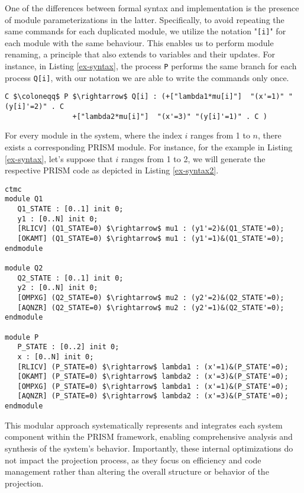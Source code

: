 One of the differences between formal syntax and implementation is the presence of module parameterizations in the latter. Specifically, to avoid repeating the same commands for each duplicated module, we utilize the notation "\texttt{[i]}" for each module with the same behaviour.   
This enables us to perform module renaming, a principle that also extends to variables and their updates. For instance, in Listing \ref{ex-syntax}, the process \texttt{P} performs the same branch for each process \texttt{Q[i]}, with our notation we are able to write the commands only once. 
\begin{lstlisting}[style=chor-color,breaklines=true, postbreak=\mbox{\textcolor{red}{$\hookrightarrow$}\space},caption={Example of an use of parameterization in the choreographic language},captionpos=b,label={ex-syntax}]
	C $\coloneqq$ P $\rightarrow$ Q[i] : (+["lambda1*mu[i]"]  "(x'=1)" "(y[i]'=2)" . C
			    +["lambda2*mu[i]"]  "(x'=3)" "(y[i]'=1)" . C )
\end{lstlisting}
For every module in the system, where the index 
$i$ ranges from 1 to $n$, there exists a corresponding PRISM module. For instance, for the example in Listing \ref{ex-syntax}, let's suppose that $i$ ranges  from 1 to 2, we will generate the respective PRISM code as depicted in Listing \ref{ex-syntax2}. 
\begin{lstlisting}[style=prism-color,caption={PRISM code generated for the choreography in Listing \ref{ex-syntax}},captionpos=b,label={ex-syntax2}]
ctmc
module Q1
   Q1_STATE : [0..1] init 0;
   y1 : [0..N] init 0;
   [RLICV] (Q1_STATE=0) $\rightarrow$ mu1 : (y1'=2)&(Q1_STATE'=0);
   [OKAMT] (Q1_STATE=0) $\rightarrow$ mu1 : (y1'=1)&(Q1_STATE'=0);
endmodule

module Q2
   Q2_STATE : [0..1] init 0;
   y2 : [0..N] init 0;
   [OMPXG] (Q2_STATE=0) $\rightarrow$ mu2 : (y2'=2)&(Q2_STATE'=0);
   [AQNZR] (Q2_STATE=0) $\rightarrow$ mu2 : (y2'=1)&(Q2_STATE'=0);
endmodule

module P
   P_STATE : [0..2] init 0;
   x : [0..N] init 0;
   [RLICV] (P_STATE=0) $\rightarrow$ lambda1 : (x'=1)&(P_STATE'=0);
   [OKAMT] (P_STATE=0) $\rightarrow$ lambda2 : (x'=3)&(P_STATE'=0);
   [OMPXG] (P_STATE=0) $\rightarrow$ lambda1 : (x'=1)&(P_STATE'=0);
   [AQNZR] (P_STATE=0) $\rightarrow$ lambda2 : (x'=3)&(P_STATE'=0);
endmodule
\end{lstlisting}
This modular approach systematically represents and integrates each system component within the PRISM framework, enabling comprehensive analysis and synthesis of the system's behavior. Importantly, these internal optimizations do not impact the projection process, as they focus on efficiency and code management rather than altering the overall structure or behavior of the projection. %

